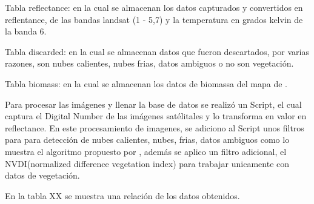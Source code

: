 Tabla reflectance: en la cual se almacenan los datos capturados y convertidos en reflentance,
de las bandas landsat (1 - 5,7) y la temperatura en grados kelvin de la banda 6.

Tabla discarded: en la cual se almacenan datos que fueron descartados, por varias razones,
son nubes calientes, nubes frias, datos ambiguos o no son vegetación.

Tabla biomass: en la cual se almacenan los datos de biomassa del mapa de \cite{baccini2012estimated}.

Para procesar las imágenes y llenar la base de datos se realizó un Script, el cual captura el Digital Number
de las imágenes satélitales y lo transforma en valor en reflectance. En este procesamiento de imagenes, se adiciono al Script unos filtros para para detección de nubes calientes,
nubes, frias, datos ambiguos como lo muestra el algoritmo propuesto por \cite{irish2000landsat}, además se aplico 
un filtro adicional, el NVDI(normalized difference vegetation index) para trabajar unicamente con datos de vegetación.

En la tabla XX se muestra una relación de los datos obtenidos.

\begin{table}
\caption{Datos obtenidos en en el proceso de procesamiento y limpieza  de datos}
\label{tab:metricas}
\centering
{}
\end{table}



